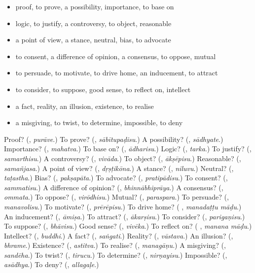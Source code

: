 \begin{itemize}
\raggedright
  \item proof, to prove, a possibility, importance, to base on
  \item logic, to justify, a controversy, to object, reasonable
  \item a point of view, a stance, neutral, bias, to advocate
  \item to consent, a difference of opinion, a consensus, to oppose, mutual
  \item to persuade, to motivate, to drive home, an inducement, to attract
  \item to consider, to suppose, good sense, to reflect on, intellect
  \item a fact, reality, an illusion, existence, to realise
  \item a misgiving, to twist, to determine, impossible, to deny
\end{itemize}

\begin{tcolorbox}[breakable,colback=teal!4,colframe=teal!35!black,title={Before you move on}]
Proof? (\textbf{}, \emph{purāve}.) To prove? (\textbf{}, \emph{sābītupaḍisu}.) A possibility? (\textbf{}, \emph{sādhyate}.) Importance? (\textbf{}, \emph{mahatva}.) To base on? (\textbf{}, \emph{ādharisu}.) Logic? (\textbf{}, \emph{tarka}.) To justify? (\textbf{}, \emph{samarthisu}.) A controversy? (\textbf{}, \emph{vivāda}.) To object? (\textbf{}, \emph{ākṣēpisu}.) Reasonable? (\textbf{}, \emph{samañjasa}.) A point of view? (\textbf{}, \emph{dṛṣṭikōna}.) A stance? (\textbf{}, \emph{niluvu}.) Neutral? (\textbf{}, \emph{taṭastha}.) Bias? (\textbf{}, \emph{pakṣapāta}.) To advocate? (\textbf{}, \emph{pratipādisu}.) To consent? (\textbf{}, \emph{sammatisu}.) A difference of opinion? (\textbf{}, \emph{bhinnābhiprāya}.) A consensus? (\textbf{}, \emph{ommata}.) To oppose? (\textbf{}, \emph{virōdhisu}.) Mutual? (\textbf{}, \emph{paraspara}.) To persuade? (\textbf{}, \emph{manavolisu}.) To motivate? (\textbf{}, \emph{prērēpisu}.) To drive home? (\textbf{ }, \emph{manadaṭṭu māḍu}.) An inducement? (\textbf{}, \emph{āmiṣa}.) To attract? (\textbf{}, \emph{ākarṣisu}.) To consider? (\textbf{}, \emph{parigaṇisu}.) To suppose? (\textbf{}, \emph{bhāvisu}.) Good sense? (\textbf{}, \emph{vivēka}.) To reflect on? (\textbf{ }, \emph{manana māḍu}.) Intellect? (\textbf{}, \emph{buddhi}.) A fact? (\textbf{}, \emph{saṅgati}.) Reality? (\textbf{}, \emph{vāstava}.) An illusion? (\textbf{}, \emph{bhrame}.) Existence? (\textbf{}, \emph{astitva}.) To realise? (\textbf{}, \emph{managāṇu}.) A misgiving? (\textbf{}, \emph{sandēha}.) To twist? (\textbf{}, \emph{tirucu}.) To determine? (\textbf{}, \emph{nirṇayisu}.) Impossible? (\textbf{}, \emph{asādhya}.) To deny? (\textbf{}, \emph{allagaḷe}.)
\end{tcolorbox}
